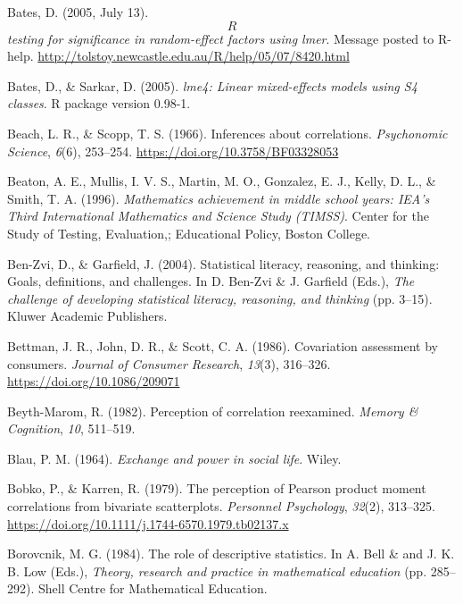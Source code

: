 \documentclass[11pt]{umnthesis}
\newlength{\cslhangindent}
\newenvironment{CSLReferences}[2] %
 {%
  \setlength{\parindent}{0pt}
  \ifodd #1 \everypar{\setlength{\hangindent}{\cslhangindent}}\ignorespaces\fi
  \ifnum #2 > 0
  \setlength{\parskip}{#2\baselineskip}
  \fi
 }%
 {}
\begin{document}
\begin{CSLReferences}{1}{0}
\leavevmode{}%
Bates, D. (2005, July 13). \emph{\[R\] testing for significance in random-effect factors using lmer}. Message posted to {R}-help. \url{http://tolstoy.newcastle.edu.au/R/help/05/07/8420.html}

\leavevmode{}%
Bates, D., \& Sarkar, D. (2005). \emph{lme4: Linear mixed-effects models using {S4} classes}. {R package version 0.98-1}.

\leavevmode{}%
Beach, L. R., \& Scopp, T. S. (1966). Inferences about correlations. \emph{Psychonomic Science}, \emph{6}(6), 253--254. \url{https://doi.org/10.3758/BF03328053}

\leavevmode{}%
Beaton, A. E., Mullis, I. V. S., Martin, M. O., Gonzalez, E. J., Kelly, D. L., \& Smith, T. A. (1996). \emph{{Mathematics achievement in middle school years: IEA's Third International Mathematics and Science Study (TIMSS)}}. Center for the Study of Testing, Evaluation,; Educational Policy, Boston College.

\leavevmode{}%
Ben-Zvi, D., \& Garfield, J. (2004). Statistical literacy, reasoning, and thinking: Goals, definitions, and challenges. In D. Ben-Zvi \& J. Garfield (Eds.), \emph{The challenge of developing statistical literacy, reasoning, and thinking} (pp. 3--15). Kluwer Academic Publishers.

\leavevmode{}%
Bettman, J. R., John, D. R., \& Scott, C. A. (1986). Covariation assessment by consumers. \emph{Journal of Consumer Research}, \emph{13}(3), 316--326. \url{https://doi.org/10.1086/209071}

\leavevmode{}%
Beyth-Marom, R. (1982). Perception of correlation reexamined. \emph{Memory \& Cognition}, \emph{10}, 511--519.

\leavevmode{}%
Blau, P. M. (1964). \emph{Exchange and power in social life}. Wiley.

\leavevmode{}%
Bobko, P., \& Karren, R. (1979). The perception of {P}earson product moment correlations from bivariate scatterplots. \emph{Personnel Psychology}, \emph{32}(2), 313--325. \url{https://doi.org/10.1111/j.1744-6570.1979.tb02137.x}

\leavevmode{}%
Borovcnik, M. G. (1984). The role of descriptive statistics. In A. Bell \& and J. K. B. Low (Eds.), \emph{Theory, research and practice in mathematical education} (pp. 285--292). Shell Centre for Mathematical Education.


\end{CSLReferences}
\end{document}
